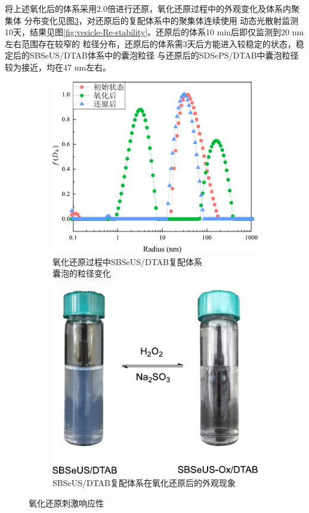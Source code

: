\documentclass[bachelor,fandolfonts,replaceperiod]{jnuthesis}
\begin{document}
    将上述氧化后的体系采用2.0倍进行还原，氧化还原过程中的外观变化及体系内聚集体
    分布变化见图\ref{fig:SBSeUS/DTAB氧化还原刺激响应性}，对还原后的复配体系中的聚集体连续使用
    动态光散射监测10天，结果见图\ref{fig:vesicle-Re-stability}。还原后的体系10 min后即仅监测到20 nm左右范围存在较窄的
    粒径分布，还原后的体系需3天后方能进入较稳定的状态，稳定后的SBSeUS/DTAB体系中的囊泡粒径
    与还原后的SDSePS/DTAB中囊泡粒径较为接近，均在47 nm左右。
    \begin{figure}[htbp]
        \begin{subfigure}[]{.5\textwidth}
            \centering
            \includegraphics[width=.98\textwidth]{figure/SBSeUS-redox-radius.pdf}
            \caption{氧化还原过程中SBSeUS/DTAB复配体系\\囊泡的粒径变化}\label{fig:SBSeUS-redox-radius}
        \end{subfigure}%
        \begin{subfigure}[]{.5\textwidth}
            \centering
            \includegraphics[width=.8\textwidth]{figure/scheme-SBSeUS-redox.pdf}
            \caption{SBSeUS/DTAB复配体系在氧化还原后的外观现象}\label{fig:scheme-SBSeUS-redox}
        \end{subfigure}%
        \caption{氧化还原刺激响应性}
        \label{fig:SBSeUS/DTAB氧化还原刺激响应性}
    \end{figure}
    
\end{document}
